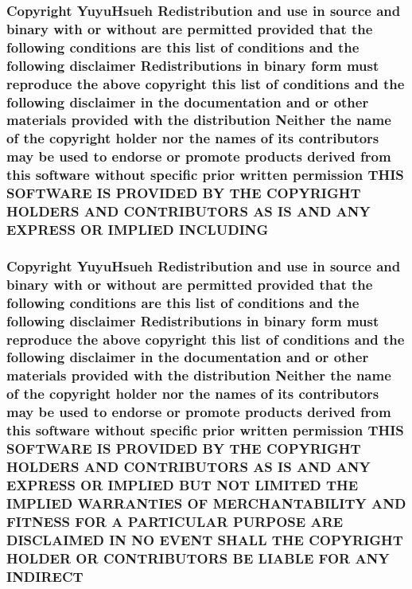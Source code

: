 \subsubsection[{\texorpdfstring{I\+N\+C\+L\+U\+D\+I\+NG}{INCLUDING}}]{\setlength{\rightskip}{0pt plus 5cm}Copyright Yuyu\+Hsueh Redistribution and use in source and binary with or without are permitted provided that the following conditions are this list of conditions and the following disclaimer Redistributions in binary form must reproduce the above copyright this list of conditions and the following disclaimer in the documentation and or other materials provided with the distribution Neither the name of the copyright holder nor the names of its contributors may be used to endorse or promote products derived from this software without specific prior written permission T\+H\+IS S\+O\+F\+T\+W\+A\+RE IS P\+R\+O\+V\+I\+D\+ED BY T\+HE C\+O\+P\+Y\+R\+I\+G\+HT H\+O\+L\+D\+E\+RS A\+ND C\+O\+N\+T\+R\+I\+B\+U\+T\+O\+RS AS IS A\+ND A\+NY E\+X\+P\+R\+E\+SS OR I\+M\+P\+L\+I\+ED I\+N\+C\+L\+U\+D\+I\+NG}\hypertarget{license_8txt_ac6699313e23a90e93d8db75154e2e689}{}\label{license_8txt_ac6699313e23a90e93d8db75154e2e689}
\subsubsection[{\texorpdfstring{I\+N\+D\+I\+R\+E\+CT}{INDIRECT}}]{\setlength{\rightskip}{0pt plus 5cm}Copyright Yuyu\+Hsueh Redistribution and use in source and binary with or without are permitted provided that the following conditions are this list of conditions and the following disclaimer Redistributions in binary form must reproduce the above copyright this list of conditions and the following disclaimer in the documentation and or other materials provided with the distribution Neither the name of the copyright holder nor the names of its contributors may be used to endorse or promote products derived from this software without specific prior written permission T\+H\+IS S\+O\+F\+T\+W\+A\+RE IS P\+R\+O\+V\+I\+D\+ED BY T\+HE C\+O\+P\+Y\+R\+I\+G\+HT H\+O\+L\+D\+E\+RS A\+ND C\+O\+N\+T\+R\+I\+B\+U\+T\+O\+RS AS IS A\+ND A\+NY E\+X\+P\+R\+E\+SS OR I\+M\+P\+L\+I\+ED B\+UT N\+OT L\+I\+M\+I\+T\+ED T\+HE I\+M\+P\+L\+I\+ED {\bf W\+A\+R\+R\+A\+N\+T\+I\+ES} OF M\+E\+R\+C\+H\+A\+N\+T\+A\+B\+I\+L\+I\+TY A\+ND F\+I\+T\+N\+E\+SS F\+OR A P\+A\+R\+T\+I\+C\+U\+L\+AR P\+U\+R\+P\+O\+SE A\+RE D\+I\+S\+C\+L\+A\+I\+M\+ED IN NO E\+V\+E\+NT S\+H\+A\+LL T\+HE C\+O\+P\+Y\+R\+I\+G\+HT H\+O\+L\+D\+ER OR C\+O\+N\+T\+R\+I\+B\+U\+T\+O\+RS BE L\+I\+A\+B\+LE F\+OR A\+NY I\+N\+D\+I\+R\+E\+CT}\hypertarget{license_8txt_a8c44c311e30c2c13cd7035f237993b51}{}\label{license_8txt_a8c44c311e30c2c13cd7035f237993b51}
